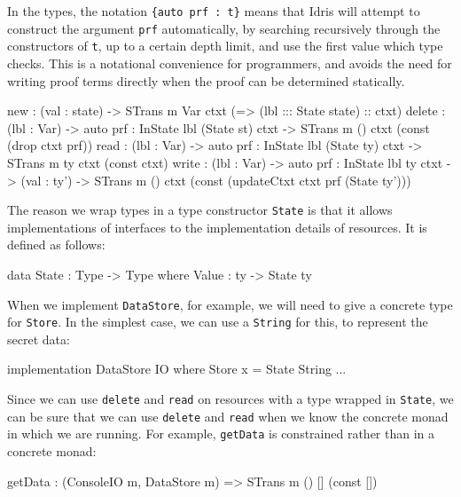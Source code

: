 In the types, the notation \texttt{\{auto prf : t\}} means that Idris will
attempt to construct the argument \texttt{prf} automatically, by searching
recursively through the constructors of \texttt{t}, up to a certain depth
limit, and use the first value which type checks. This is a notational
convenience for programmers, and avoids the need for writing proof terms
directly when the proof can be determined statically.

\small
\begin{code}[float=h, frame=single,caption={Primitive operations in
\texttt{STrans} for creating, deleting, reading and writing resources},label=fig:stransprims]
new : (val : state) -> STrans m Var ctxt (\lbl => (lbl ::: State state) :: ctxt)
delete : (lbl : Var) -> {auto prf : InState lbl (State st) ctxt} ->
         STrans m () ctxt (const (drop ctxt prf))
read : (lbl : Var) -> {auto prf : InState lbl (State ty) ctxt} ->
       STrans m ty ctxt (const ctxt)
write : (lbl : Var) -> {auto prf : InState lbl ty ctxt} ->
        (val : ty') -> STrans m () ctxt (const (updateCtxt ctxt prf (State ty')))
\end{code}
\normalsize

The reason we wrap types in a type constructor \texttt{State} is that it
allows implementations of interfaces to  the implementation details
of resources.  It is defined as follows:

\small
\begin{code}
data State : Type -> Type where
     Value : ty -> State ty
\end{code}
\normalsize

When we implement \texttt{DataStore}, for example, we will need to give
a concrete type for \texttt{Store}. In the simplest case, we can use a
\texttt{String} for this, to represent the secret data:

\small
\begin{code}
implementation DataStore IO where
  Store x = State String
  ...
\end{code}
\normalsize

Since we can  use \texttt{delete} and \texttt{read} on
resources with a type wrapped in \texttt{State}, we can be sure that
we can  use \texttt{delete} and \texttt{read} when we know
the concrete monad in which we are running.
For example, \texttt{getData} is constrained rather than in a
concrete monad:

\small
\begin{code}
getData : (ConsoleIO m, DataStore m) => STrans m () [] (const [])
\end{code}
\normalsize

